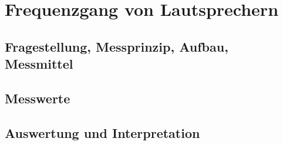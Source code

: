 %
%
\chapter{Frequenzgang von Lautsprechern}


\label{chap:FrequenzgangVonLautsprechern}

\section{Fragestellung, Messprinzip, Aufbau, Messmittel}

\label{chap:VERSUCH_2_FRAGESTELLUNG}

\section{Messwerte}
\label{chap:VERSUCH_2_MESSWERTE}


\section{Auswertung und Interpretation}
\label{chap:AUSWERTUNGUNDINTERPRETATION}



